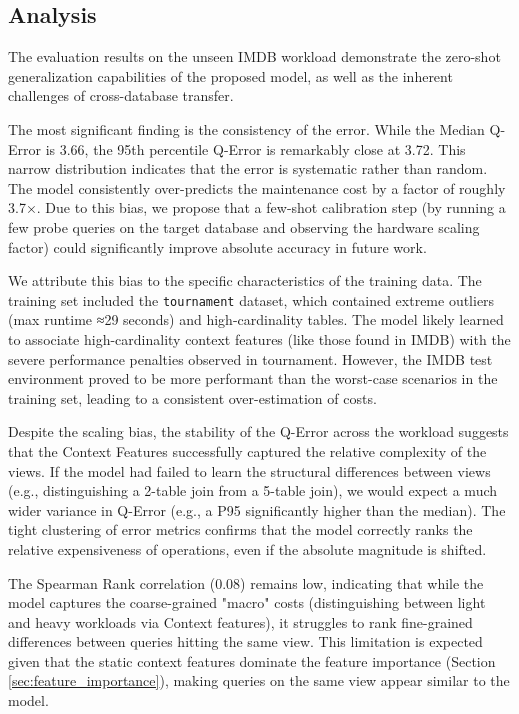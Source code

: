 
\subsection{Analysis}
\label{sec:cost_model_analysis}

The evaluation results on the unseen IMDB workload demonstrate the zero-shot generalization capabilities of the proposed model, as well as the inherent challenges of cross-database transfer.

The most significant finding is the consistency of the error. While the Median Q-Error is 3.66, the 95th percentile Q-Error is remarkably close at 3.72. This narrow distribution indicates that the error is systematic rather than random. The model consistently over-predicts the maintenance cost by a factor of roughly 3.7×. Due to this bias, we propose that a few-shot calibration step (by running a few probe queries on the target database and observing the hardware scaling factor) could significantly improve absolute accuracy in future work.

We attribute this bias to the specific characteristics of the training data. The training set included the \texttt{tournament} dataset, which contained extreme outliers (max runtime ≈29 seconds) and high-cardinality tables. The model likely learned to associate high-cardinality context features (like those found in IMDB) with the severe performance penalties observed in tournament. However, the IMDB test environment proved to be more performant than the worst-case scenarios in the training set, leading to a consistent over-estimation of costs.

Despite the scaling bias, the stability of the Q-Error across the workload suggests that the Context Features successfully captured the relative complexity of the views. If the model had failed to learn the structural differences between views (e.g., distinguishing a 2-table join from a 5-table join), we would expect a much wider variance in Q-Error (e.g., a P95 significantly higher than the median). The tight clustering of error metrics confirms that the model correctly ranks the relative expensiveness of operations, even if the absolute magnitude is shifted.

The Spearman Rank correlation (0.08) remains low, indicating that while the model captures the coarse-grained "macro" costs (distinguishing between light and heavy workloads via Context features), it struggles to rank fine-grained differences between queries hitting the same view. This limitation is expected given that the static context features dominate the feature importance (Section \ref{sec:feature_importance}), making queries on the same view appear similar to the model.

